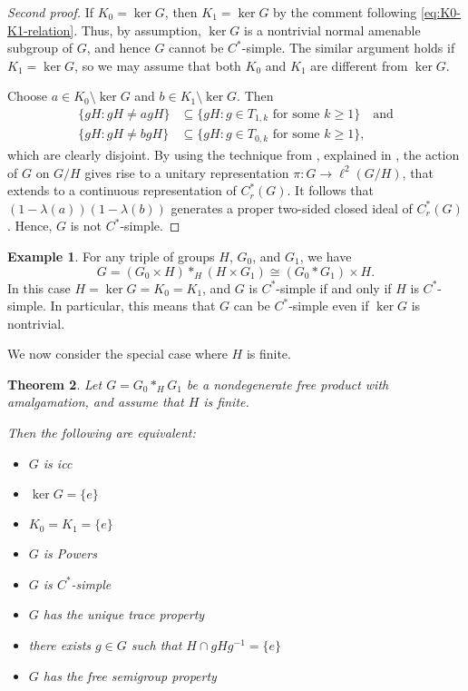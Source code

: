 \documentclass[a4paper]{amsart}
\theoremstyle{plain}
\newtheorem{theorem}{Theorem}
\theoremstyle{definition}
\newtheorem{example}[theorem]{Example}
\theoremstyle{remark}
\numberwithin{theorem}{section}
\begin{document}
\begin{proof}[Second proof]
If $K_0=\ker G$, then $K_1=\ker G$ by the comment following \eqref{eq:K0-K1-relation}.
Thus, by assumption, $\ker G$ is a nontrivial normal amenable subgroup of $G$, and hence $G$ cannot be $C^*$-simple.
The similar argument holds if $K_1=\ker G$, so we may assume that both $K_0$ and $K_1$ are different from $\ker G$.

Choose $a\in K_0\setminus\ker G$ and $b\in K_1\setminus\ker G$.
Then
\[
\begin{split}
\{gH : gH\neq agH\}&\subseteq\{gH:g\in T_{1,k}\text{ for some }k\geq 1\} \quad\text{and}\\
\{gH : gH\neq bgH\}&\subseteq\{gH:g\in T_{0,k}\text{ for some }k\geq 1\},
\end{split}
\]
which are clearly disjoint.
By using the technique from \cite[Proposition~5.8]{Haagerup-Olesen}, explained in \cite[p.~12]{Ozawa},
the action of $G$ on $G/H$ gives rise to a unitary representation $\pi\colon G\to\ell^2(G/H)$,
that extends to a continuous representation of $C^*_r(G)$.
It follows that $(1-\lambda(a))(1-\lambda(b))$ generates a proper two-sided closed ideal of $C^*_r(G)$.
Hence, $G$ is not $C^*$-simple.
\end{proof}

\begin{example}
For any triple of groups $H$, $G_0$, and $G_1$, we have
\[
G = (G_0 \times H) *_H (H \times G_1) \cong (G_0 * G_1) \times H.
\]
In this case $H=\ker G=K_0=K_1$, and $G$ is $C^*$-simple if and only if $H$ is $C^*$-simple.
In particular, this means that $G$ can be $C^*$-simple even if $\operatorname{ker}G$ is nontrivial.
\end{example}

We now consider the special case where $H$ is finite.

\begin{theorem}\label{thm:finite amalgam}
Let $G=G_0*_H G_1$ be a nondegenerate free product with amalgamation,
and assume that $H$ is finite.

Then the following are equivalent:
\begin{itemize}
\item[(i)] $G$ is icc
\item[(ii)] $\operatorname{ker}G=\{e\}$
\item[(iii)] $K_0=K_1=\{e\}$
\item[(iv)] $G$ is Powers
\item[(v)] $G$ is $C^*$-simple
\item[(vi)] $G$ has the unique trace property
\item[(vii)] there exists $g \in G$ such that $H \cap gHg^{-1} = \{e\}$
\item[(viii)] $G$ has the free semigroup property
\end{itemize}
\end{theorem}
\end{document}
